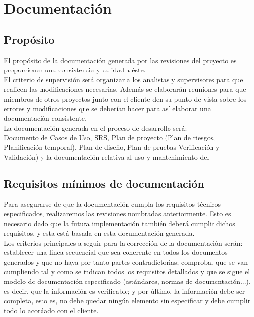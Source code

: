 \documentclass[11pt, a4paper, twoside, titlepage]{article}
\begin{document}
	\section{Documentación} %
		\subsection{Propósito}
			El propósito de la documentación generada por las revisiones del proyecto es proporcionar una consistencia y calidad a éste.\\ %
			El criterio de supervisión será organizar a los analistas y supervisores para que realicen las modificaciones necesarias. Además se elaborarán reuniones para que miembros de otros proyectos junto con el cliente den su punto de vista sobre los errores y modificaciones que se deberían hacer para así elaborar una documentación consistente.\\

			La documentación generada en el proceso de desarrollo será: \\
			Documento de Casos de Uso, SRS, Plan de proyecto (Plan de riesgos, Planificación temporal), Plan de diseño, Plan de pruebas Verificación y Validación) y la documentación relativa al uso y mantenimiento del \software.
			
		\subsection{Requisitos mínimos de documentación}
			Para asegurarse de que la documentación cumpla los requisitos técnicos especificados, realizaremos las revisiones nombradas
anteriormente. Esto es necesario dado que la futura implementación también deberá cumplir dichos requisitos, y esta está basada en esta documentación generada.\\

			Los criterios principales a seguir para la corrección de la documentación serán: establecer una linea secuencial que sea
coherente en todos los documentos generados y que no haya por tanto partes contradictorias; comprobar que se van cumpliendo tal y como se indican todos los requisitos detallados y que se sigue el modelo de documentación especificado (estándares, normas de documentación...), es decir, que la información es verificable; y por último, la información debe ser completa, esto es, no debe quedar ningún elemento sin especificar y debe cumplir todo lo acordado con el cliente.
			
\end{document}
